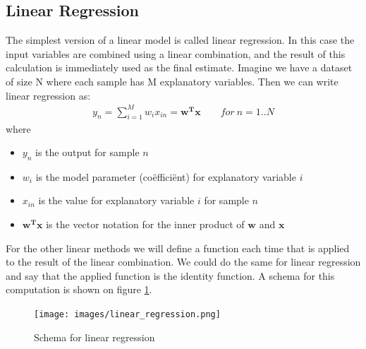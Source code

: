 \subsection{Linear Regression}
\label{subsec:glm-linear-regression}
The simplest version of a linear model is called linear regression\cite{caltechmachinelearning}\cite{wikilinearregression}. In this case the input variables are combined using a linear combination, and the result of this calculation is immediately used as the final estimate. Imagine we have a dataset of size N where each sample has M explanatory variables. Then we can write linear regression as:\\
\begin{equation}
\begin{split}
y_{n} = \sum_{i=1}^{M}w_{i}x_{in} = \bm{w^{T}x}   \qquad for\ n=1..N
\end{split}
\end{equation}
where
\begin{itemize}
	\item $y_{n}$ is the output for sample $n$
	\item $w_{i}$ is the model parameter (co\"effici\"ent) for explanatory variable $i$
	\item $x_{in}$ is the value for explanatory variable $i$ for sample $n$
	\item $\bm{w^{T}x}$ is the vector notation for the inner product of $\bm{w}$ and $\bm{x}$
\end{itemize}
For the other linear methods we will define a function each time that is applied to the result of the linear combination. We could do the same for linear regression and say that the applied function is the identity function. A schema for this computation is shown on figure \ref{fig:glm-linear-regression}.\\
\begin{figure}
	\centering
	\texttt{[image: images/linear\_regression.png]}
	\caption{Schema for linear regression}
	\label{fig:glm-linear-regression}
\end{figure}
